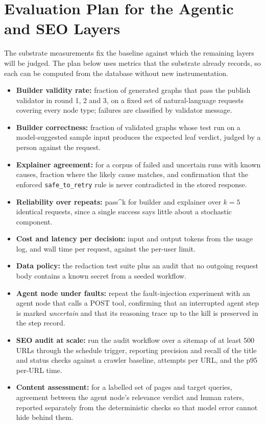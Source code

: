 \documentclass[conference]{IEEEtran}
\begin{document}
\section{Evaluation Plan for the Agentic and SEO Layers}
The substrate measurements fix the baseline against which the remaining layers will be judged. The plan below uses metrics that the substrate already records, so each can be computed from the database without new instrumentation.
\begin{itemize}
\item \textbf{Builder validity rate:} fraction of generated graphs that pass the publish validator in round 1, 2 and 3, on a fixed set of natural-language requests covering every node type; failures are classified by validator message.
\item \textbf{Builder correctness:} fraction of validated graphs whose test run on a model-suggested sample input produces the expected leaf verdict, judged by a person against the request.
\item \textbf{Explainer agreement:} for a corpus of failed and uncertain runs with known causes, fraction where the likely cause matches, and confirmation that the enforced \texttt{safe\_to\_retry} rule is never contradicted in the stored response.
\item \textbf{Reliability over repeats:} pass\^{}k \cite{yao2024taubench} for builder and explainer over $k=5$ identical requests, since a single success says little about a stochastic component.
\item \textbf{Cost and latency per decision:} input and output tokens from the usage log, and wall time per request, against the per-user limit.
\item \textbf{Data policy:} the redaction test suite plus an audit that no outgoing request body contains a known secret from a seeded workflow.
\item \textbf{Agent node under faults:} repeat the fault-injection experiment with an agent node that calls a POST tool, confirming that an interrupted agent step is marked \emph{uncertain} and that its reasoning trace up to the kill is preserved in the step record.
\item \textbf{SEO audit at scale:} run the audit workflow over a sitemap of at least 500 URLs through the schedule trigger, reporting precision and recall of the title and status checks against a crawler baseline, attempts per URL, and the p95 per-URL time.
\item \textbf{Content assessment:} for a labelled set of pages and target queries, agreement between the agent node's relevance verdict and human raters, reported separately from the deterministic checks so that model error cannot hide behind them.
\end{itemize}
\end{document}
